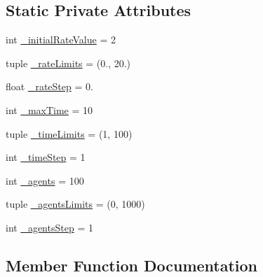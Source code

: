 \subsection*{Static Private Attributes}
\begin{DoxyCompactItemize}
\item 
int \hyperlink{class_mu_mo_t_1_1_mu_mo_tdefault_adbfda01292fc4c7936ed57523fd625c7}{\+\_\+initial\+Rate\+Value} = 2
\item 
tuple \hyperlink{class_mu_mo_t_1_1_mu_mo_tdefault_a89f788e3d778e1e0554c57832275d484}{\+\_\+rate\+Limits} = (0., 20.)
\item 
float \hyperlink{class_mu_mo_t_1_1_mu_mo_tdefault_aa45ec6be070d9881c9c018a533f6573c}{\+\_\+rate\+Step} = 0.
\item 
int \hyperlink{class_mu_mo_t_1_1_mu_mo_tdefault_a46ffe9aa10cdab976a57d8ba1d3cd2f6}{\+\_\+max\+Time} = 10
\item 
tuple \hyperlink{class_mu_mo_t_1_1_mu_mo_tdefault_a2208809031da7f126f4416fb64cdb026}{\+\_\+time\+Limits} = (1, 100)
\item 
int \hyperlink{class_mu_mo_t_1_1_mu_mo_tdefault_ad83203bcc6032b30e6f5b57f8982af9e}{\+\_\+time\+Step} = 1
\item 
int \hyperlink{class_mu_mo_t_1_1_mu_mo_tdefault_a42f05ec35f2b5b564e064bb19ebd36cf}{\+\_\+agents} = 100
\item 
tuple \hyperlink{class_mu_mo_t_1_1_mu_mo_tdefault_a01360abcb6eddb212c38b66852c35e17}{\+\_\+agents\+Limits} = (0, 1000)
\item 
int \hyperlink{class_mu_mo_t_1_1_mu_mo_tdefault_a55b7c54066a90600796a35e96ef5743b}{\+\_\+agents\+Step} = 1
\end{DoxyCompactItemize}


\subsection{Member Function Documentation}
\mbox{\label{class_mu_mo_t_1_1_mu_mo_tdefault_a390063ec9e63f433bf06fa72f608b7e4}} 
